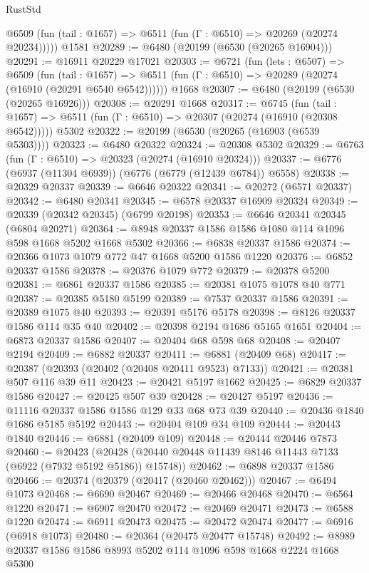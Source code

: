 \begin{lexlean}{RustStd}
\begin{coremodule}
      @6509 (fun (tail : @1657) => @6511 (fun (Γ : @6510) => @20269 (@20274 @20234)))))
    @1581
@20289 := @6480 (@20199 (@6530 (@20265 @16904)))
@20291 := @16911 @20229 @17021
@20303 := @6721
    (fun (lets : @6507) =>
    @6509
      (fun (tail : @1657) =>
      @6511 (fun (Γ : @6510) => @20289 (@20274 (@16910 (@20291 @6540 @6542))))))
    @1668
@20307 := @6480 (@20199 (@6530 (@20265 @16926)))
@20308 := @20291 @1668
@20317 := @6745
    (fun (tail : @1657) => @6511 (fun (Γ : @6510) => @20307 (@20274 (@16910 (@20308 @6542)))))
    @5302
@20322 := @20199 (@6530 (@20265 (@16903 (@6539 @5303))))
@20323 := @6480 @20322
@20324 := @20308 @5302
@20329 := @6763 (fun (Γ : @6510) => @20323 (@20274 (@16910 @20324)))
@20337 := @6776 (@6937 (@11304 @6939)) (@6776 (@6779 (@12439 @6784)) @6558)
@20338 := @20329 @20337
@20339 := @6646 @20322
@20341 := @20272 (@6571 @20337)
@20342 := @6480 @20341
@20345 := @6578 @20337 @16909 @20324
@20349 := @20339 (@20342 @20345) (@6799 @20198)
@20353 := @6646 @20341 @20345 (@6804 @20271)
@20364 := @8948 @20337 @1586 @1586 @1080 @114 @1096 @598 @1668 @5202 @1668 @5302
@20366 := @6838 @20337 @1586
@20374 := @20366 @1073 @1079 @772 @47 @1668 @5200 @1586 @1220
@20376 := @6852 @20337 @1586
@20378 := @20376 @1079 @772
@20379 := @20378 @5200
@20381 := @6861 @20337 @1586
@20385 := @20381 @1075 @1078 @40 @771
@20387 := @20385 @5180 @5199
@20389 := @7537 @20337 @1586
@20391 := @20389 @1075 @40
@20393 := @20391 @5176 @5178
@20398 := @8126 @20337 @1586 @114 @35 @40
@20402 := @20398 @2194 @1686 @5165 @1651
@20404 := @6873 @20337 @1586
@20407 := @20404 @68 @598 @68
@20408 := @20407 @2194
@20409 := @6882 @20337
@20411 := @6881 (@20409 @68)
@20417 := @20387 (@20393 (@20402 (@20408 @20411 @9523) @7133))
@20421 := @20381 @507 @116 @39 @11
@20423 := @20421 @5197 @1662
@20425 := @6829 @20337 @1586
@20427 := @20425 @507 @39
@20428 := @20427 @5197
@20436 := @11116 @20337 @1586 @1586 @129 @33 @68 @73 @39
@20440 := @20436 @1840 @1686 @5185 @5192
@20443 := @20404 @109 @34 @109
@20444 := @20443 @1840
@20446 := @6881 (@20409 @109)
@20448 := @20444 @20446 @7873
@20460 := @20423
    (@20428 (@20440 @20448 @11439 @8146 @11443 @7133 (@6922 (@7932 @5192 @5186)) @15748))
@20462 := @6898 @20337 @1586
@20466 := @20374 (@20379 (@20417 (@20460 @20462)))
@20467 := @6494 @1073
@20468 := @6690 @20467
@20469 := @20466 @20468
@20470 := @6564 @1220
@20471 := @6907 @20470
@20472 := @20469 @20471
@20473 := @6588 @1220
@20474 := @6911 @20473
@20475 := @20472 @20474
@20477 := @6916 (@6918 @1073)
@20480 := @20364 (@20475 @20477 @15748)
@20492 := @8989 @20337 @1586 @1586 @8993 @5202 @114 @1096 @598 @1668 @2224 @1668 @5300

\end{coremodule}
\end{lexlean}
